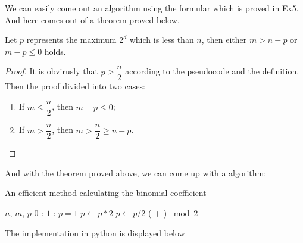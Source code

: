 We can easily come out an algorithm using the formular which is proved in Ex5. And here comes out of a theorem proved below.
\begin{theorem}
Let $p$ represents the maximum $2^d$ which is less than $n$, then either $m > n - p$ or $m - p \leq 0$ holds.
\end{theorem}
\begin{proof}
	It is obvirusly that $p \geq \dfrac{n}{2}$ according to the pseudocode and the definition. Then the proof divided into two cases:
	\begin{enumerate}
		\item If $m \leq \dfrac{n}{2}$, then $m - p \leq 0$;
		\item If $m > \dfrac{n}{2}$, then $m > \dfrac{n}{2} \geq n - p$.
	\end{enumerate}
\end{proof}

And with the theorem proved above, we can come up with a algorithm:
\begin{algorithm}[H]
	\caption{An efficient method calculating the binomial coefficient}
	\begin{algorithmic}[1]
		 {$n$, $m$, $p$}
				\State \Return $0$
			\EndIf
			 :
				\State \Return $1$
			\EndIf
			 :
				\State $p = 1$
					\State $p \leftarrow p * 2$
				\EndWhile
			\Else
					\State $p \leftarrow p / 2$
				\EndWhile
			\EndIf
			\State \Return ( + ) $\bmod 2$
		\EndFunction
	\end{algorithmic}
\end{algorithm}

\noindent The implementation in python is displayed below
